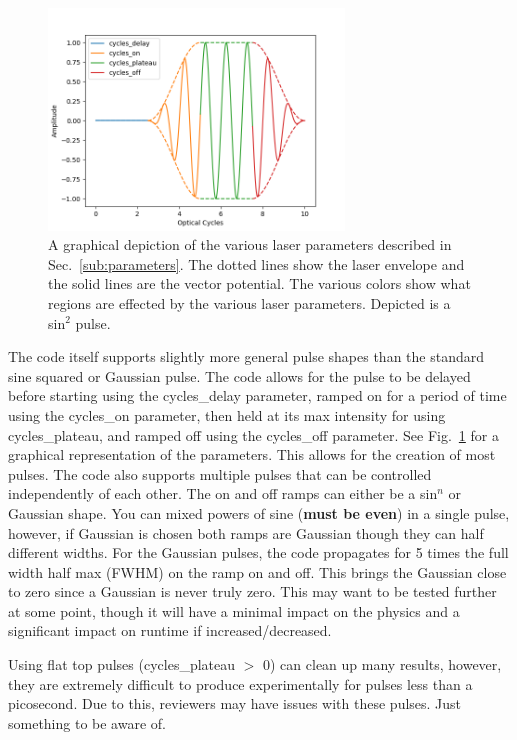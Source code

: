 \documentclass{article}
\begin{document}
\begin{figure}[t]
\centering
\includegraphics[width=0.7\textwidth]{Pulse.png}
\caption{A graphical depiction of the various laser parameters described in Sec.~\ref{sub:parameters}. The dotted lines show the laser envelope and the solid lines are the vector potential. The various colors show what regions are effected by the various laser parameters. Depicted is a sin$^2$ pulse.}
\label{fig:pulse}
\end{figure}

The code itself supports slightly more general pulse shapes than the standard sine squared or Gaussian pulse. The code allows for the pulse to be delayed before starting using the cycles\_delay parameter, ramped on for a period of time using the cycles\_on parameter, then held at its max intensity for using cycles\_plateau, and ramped off using the cycles\_off parameter. See Fig.~\ref{fig:pulse} for a graphical representation of the parameters. This allows for the creation of most pulses. The code also supports multiple pulses that can be controlled independently of each other. The on and off ramps can either be a sin$^n$ or Gaussian shape. You can mixed powers of sine (\textbf{must be even}) in a single pulse, however, if Gaussian is chosen both ramps are Gaussian though they can half different widths. For the Gaussian pulses, the code propagates for 5 times the full width half max (FWHM) on the ramp on and off. This brings the Gaussian close to zero since a Gaussian is never truly zero. This may want to be tested further at some point, though it will have a minimal impact on the physics and a significant impact on runtime if increased/decreased.

Using flat top pulses (cycles\_plateau $>$ 0) can clean up many results, however, they are extremely difficult to produce experimentally for pulses less than a picosecond. Due to this, reviewers may have issues with these pulses. Just something to be aware of.
\end{document}
